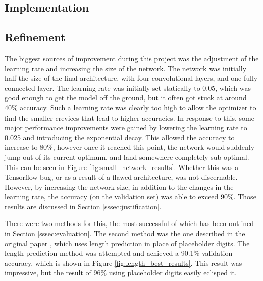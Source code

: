 \documentclass[12pt]{article}
\begin{document}
\subsection{Implementation}


\subsection{Refinement}
The biggest sources of improvement during this project was the adjustment of the learning rate and increasing the size of the network.
The network was initially half the size of the final architecture, with four convolutional layers, and one fully connected layer.
The learning rate was initially set statically to 0.05, which was good enough to get the model off the ground, but it often got stuck at around 40\% accuracy. 
Such a learning rate was clearly too high to allow the optimizer to find the smaller crevices that lead to higher accuracies. 
In response to this, some major performance improvements were gained by lowering the learning rate to 0.025 and introducing the exponential decay.
This allowed the accuracy to increase to 80\%, however once it reached this point, the network would suddenly jump out of its current optimum, and land somewhere completely sub-optimal. 
This can be seen in Figure \ref{fig:small_network_results}.
Whether this was a Tensorflow bug, or as a result of a flawed architecture, was not discernable.
However, by increasing the network size, in addition to the changes in the learning rate, the accuracy (on the validation set) was able to exceed 90\%. 
Those results are discussed in Section \ref{sssec:justification}.

There were two methods for this, the most successful of which has been outlined in Section \ref{sssec:evaluation}.
The second method was the one described in the original paper \cite{svhn_original_paper}, which uses length prediction in place of placeholder digits.
The length prediction method was attempted and achieved a 90.1\% validation accuracy, which is shown in Figure \ref{fig:length_best_results}.
This result was impressive, but the result of 96\% using placeholder digits easily eclisped it.
\end{document}

